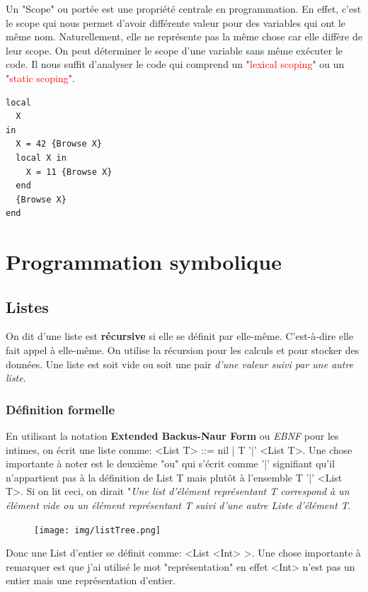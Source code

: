 \documentclass{report}
\begin{document}
Un "Scope" ou portée est une propriété centrale en programmation. En effet, c'est le scope qui nous permet d'avoir différente valeur pour des variables qui ont le même nom. Naturellement, elle ne représente pas la même chose car elle diffère de leur scope. On peut déterminer le scope d'une variable sans même exécuter le code. Il nous suffit d'analyser le code qui comprend un "\textcolor{red}{lexical scoping}" ou un "\textcolor{red}{static scoping}".
\begin{lstlisting}[escapechar=\%]
local
  X
in 
  X = 42 {Browse X}
  local X in
    X = 11 {Browse X}
  end
  {Browse X}
end
\end{lstlisting}


\chapter{Programmation symbolique}
\section{Listes}
On dit d'une liste est \textbf{récursive} si elle se définit par elle-même. C'est-à-dire elle fait appel à elle-même. On utilise la récursion pour les calculs et pour stocker des données.
Une liste est soit vide ou soit une pair \textit{d'une valeur suivi par une autre liste}.
\subsection{Définition formelle}
En utilisant la notation \textbf{Extended Backus-Naur Form} ou \textit{EBNF} pour les intimes, on écrit une liste comme: <List T> ::= nil | T '|' <List T>. Une chose importante à noter est le deuxième "ou" qui s'écrit comme '|' signifiant qu'il n'appartient pas à la définition de List T mais plutôt à l'ensemble T '|' <List T>. Si on lit ceci, on dirait "\textit{Une list d'élément représentant T correspond à un élément vide ou un élément représentant T suivi d'une autre Liste d'élément T}.\\

\begin{figure}
	\centering
	\texttt{[image: img/listTree.png]}
\end{figure}
Donc une List d'entier se définit comme: <List <Int> >. Une chose importante à remarquer est que j'ai utilisé le mot "représentation" en effet <Int> n'est pas un entier mais une représentation d'entier.\\
\end{document}
